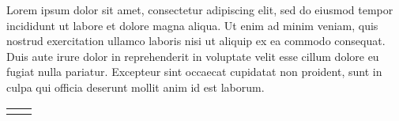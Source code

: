 \documentclass[12pt,twoside,a4paper]{book}
\begin{document}
Lorem ipsum dolor sit amet, consectetur adipiscing elit, sed do eiusmod tempor
incididunt ut labore et dolore magna aliqua.
Ut enim ad minim veniam, quis nostrud exercitation ullamco laboris nisi ut
aliquip ex ea commodo consequat.
Duis aute irure dolor in reprehenderit in voluptate velit esse cillum dolore
eu fugiat nulla pariatur.
Excepteur sint occaecat cupidatat non proident, sunt in culpa qui officia
deserunt mollit anim id est laborum.

%
\begin{table}[htbp]
  
\end{table}

\begin{table}[htbp]
  
\end{table}

\begin{table}[htbp]
  
\end{table}

\begin{table}[htbp]
  
\end{table}

\begin{table}[htbp]
  
\end{table}

\begin{table}[htbp]
  
\end{table}

\begin{table}[htbp]
  
\end{table}

\begin{table}[htbp]
  
\end{table}

\begin{table}[htbp]
  \centering
  \begin{tabular}{c c}
    \begin{minipage}[][0.44\linewidth][t]{0.4\linewidth}
      
    \end{minipage}
&
    \begin{minipage}[][0.44\linewidth][t]{0.4\linewidth}
      
    \end{minipage}
  \end{tabular}
\end{table}
\end{document}
